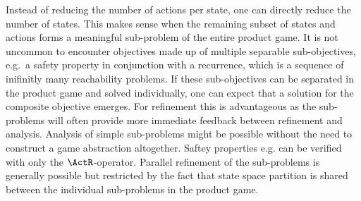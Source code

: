 Instead of reducing the number of actions per state, one can directly reduce the number of states.
This makes sense when the remaining subset of states and actions forms a meaningful sub-problem of the entire product game.
It is not uncommon to encounter objectives made up of multiple separable sub-objectives, e.g.\ a safety property in conjunction with a recurrence, which is a sequence of inifinitly many reachability problems.
If these sub-objectives can be separated in the product game and solved individually, one can expect that a solution for the composite objective emerges.
For refinement this is advantageous as the sub-problems will often provide more immediate feedback between refinement and analysis.
Analysis of simple sub-problems might be possible without the need to construct a game abstraction altogether.
Saftey properties e.g. can be verified with only the $\ActR$-operator.
Parallel refinement of the sub-problems is generally possible but restricted by the fact that state space partition is shared between the individual sub-problems in the product game.

